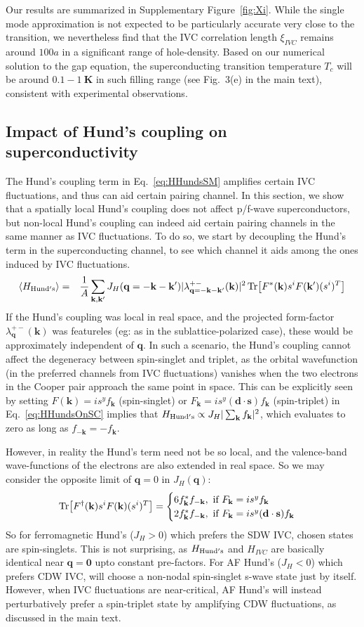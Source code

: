 \documentclass[aps,pra,twocolumn,superscriptaddress,10pt,article,nofootinbib,showpacs,longbibliography]{revtex4-1}
\def \d{{\mathbf d}}
\def \k{{\mathbf k}}
\def \q{{\mathbf q}}
\def \s{{\mathbf s}}
\def \K{{\mathbf K}}
\def \beq{\begin{eqnarray}}
\def \eeq{\end{eqnarray}}
\begin{document}
Our results are summarized in Supplementary Figure~\ref{fig:Xi}. While the single mode approximation is not expected to be particularly accurate very close to the transition, we nevertheless find that the IVC correlation length $\xi_{IVC}$ remains around $100 a$ in a significant range of hole-density. Based on our numerical solution to the gap equation, the superconducting transition temperature $T_c$ will be around $\SI{0.1}-\SI{1}{\K}$ in such filling range (see Fig.~3(e) in the main text), consistent with experimental observations. 

\subsection{Impact of Hund's coupling on superconductivity}
The Hund's coupling term in Eq.~\eqref{eq:HHundsSM} amplifies certain IVC fluctuations, and thus can aid certain pairing channel.
In this section, we show that a spatially local Hund's coupling does not affect p/f-wave superconductors, but non-local Hund's coupling can indeed aid certain pairing channels in the same manner as IVC fluctuations.
To do so, we start by decoupling the Hund's term in the superconducting channel, to see which channel it aids among the ones induced by IVC fluctuations. 
\beq
\langle  H_{\rm Hund's} \rangle &=& \frac{1}{A} \sum_{\k, \k^\prime} J_H(\q = -\k - \k^\prime) |\lambda^{+-}_{\q = -\k - \k^\prime}(\k)|^2 \Tr[F^*(\k) s^i F(\k^\prime) (s^i)^T]
\label{eq:HHundsOnSC}
\eeq
If the Hund's coupling was local in real space, and the projected form-factor $\lambda^{+-}_\q(\k)$ was featureles (eg: as in the sublattice-polarized case), these would be approximately independent of $\q$.  
In such a scenario, the Hund's coupling cannot affect the degeneracy between spin-singlet and triplet, as the orbital wavefunction (in the preferred channels from IVC fluctuations) vanishes when the two electrons in the Cooper pair approach the same point in space.  
This can be explicitly seen by setting $F(\k) = i s^y f_\k$ (spin-singlet) or $F_\k = i s^y (\d \cdot \s) f_\k$ (spin-triplet) in Eq.~\eqref{eq:HHundsOnSC} implies that $H_{\rm Hund's} \propto J_H |\sum_\k f_\k|^2$, which evaluates to zero as long as $f_{-\k} = - f_{\k}$.


However, in reality the Hund's term need not be so local, and the valence-band wave-functions of the electrons are also extended in real space. 
So we may consider the opposite limit of $\q = 0$ in $J_H(\q)$:
\beq
\Tr[F^\dagger(\k) s^i F(\k) (s^i)^T] = \begin{cases}  6 f_\k^* f_{-\k}, \text{ if } F_\k = i s^y f_\k \\  2 f_\k^* f_{-\k}, \text{ if } F_\k = i s^y (\d \cdot \s) f_\k \end{cases}
\eeq
So for ferromagnetic Hund's ($J_H > 0$) which prefers the SDW IVC, chosen states are  spin-singlets. 
This is not surprising, as $H_{\rm Hund's}$ and $H_{IVC}$ are basically identical near $\q  = \mathbf{0}$ upto constant pre-factors. 
For AF Hund's ($J_H < 0$) which prefers CDW IVC, will choose a non-nodal spin-singlet s-wave state just by itself. 
However, when IVC fluctuations are near-critical, AF Hund's will instead perturbatively prefer a spin-triplet state by amplifying CDW fluctuations, as discussed in the main text.
\end{document}
